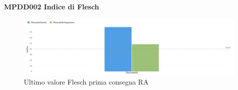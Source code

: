 \documentclass[PianoDiQualifica.tex]{subfiles}
\begin{document}
\textbf{MPDD002 Indice di Flesch}
\begin{figure}[H]
	\centering
	\includegraphics[width=1\linewidth]{RA/flesch}
	\caption{Ultimo valore Flesch prima consegna RA}
	\label{fig:processi}
\end{figure}

\end{document}
